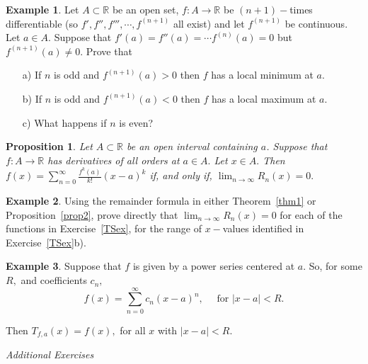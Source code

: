 \documentclass[openany, amssymb, psamsfonts]{amsart}
\newcommand{\bbR}{\mathbb{R}}
\newtheorem{prop}{Proposition}[section]
\theoremstyle{definition}
\newtheorem{exmp}{Example}[section]
\numberwithin{equation}{section}
\begin{document}
\begin{exmp}


Let $A\subset \bbR$ be an open set, $f:A\to\bbR$ be $(n+1)-$times differentiable (so $f',f'',f''',\cdots, f^{(n+1)}$ all exist) and let $f^{(n+1)}$ be continuous. Let $a\in A.$ 
Suppose that $f'(a)=f''(a)=\cdots f^{(n)}(a)=0$ but $f^{(n+1)}(a)\neq 0.$ Prove that 
\begin{enumerate}
\item[a)] If $n$ is odd and $f^{(n+1)}(a)>0$ then $f$ has a local minimum at $a.$
\item[b)] If $n$ is odd and $f^{(n+1)}(a)<0$ then $f$ has a local maximum at $a.$ 
\item[c)] What happens if $n$ is even?
\end{enumerate}
\end{exmp}

\begin{prop}

Let $A\subset \bbR$ be an open interval containing $a$. Suppose that $f:A\to\bbR$ has derivatives of all orders at $a\in A.$ Let $x\in A.$  
Then 
$f(x)=\displaystyle \sum_{n=0}^\infty \frac{f^{k}(a)}{k!} (x-a)^k$ if, and only if, $\displaystyle \lim_{n\to\infty} R_n(x) = 0.$ 
\end{prop} 


\begin{exmp}
 Using the remainder formula in either Theorem~\ref{thm1} or Proposition~\ref{prop2}, prove directly that $\lim_{n\to\infty} R_n(x)=0$ for each of the functions in Exercise~\ref{TSex}, for the range of $x-$values identified in Exercise~\ref{TSex}b).

 \end{exmp} 








 



\begin{exmp}
Suppose that $f$ is given by a power series centered at $a$. So, for some $R,$ and coefficients $c_n,$
$$f(x) = \sum_{n=0}^\infty c_n (x-a)^n,\quad \text{ for } |x-a|<R.$$

Then
 $T_{f,a}(x)=f(x),$ for all $x$ with $|x-a|<R.$ 


\end{exmp} 
\bigskip




\begin{center}
{\em Additional Exercises}
\end{center}
\end{document}
